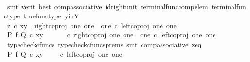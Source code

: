 \begin{isabellebody}
\ \ \ \ \ \ \ \ \isamarkupfalse%
\ {\isacharparenleft}{\kern0pt}smt\ {\isacharparenleft}{\kern0pt}verit{\isacharcomma}{\kern0pt}\ best{\isacharparenright}{\kern0pt}\ comp{\isacharunderscore}{\kern0pt}associative{}\ id{\isacharunderscore}{\kern0pt}right{\isacharunderscore}{\kern0pt}unit{}\ terminal{\isacharunderscore}{\kern0pt}func{\isacharunderscore}{\kern0pt}comp{\isacharunderscore}{\kern0pt}elem\ terminal{\isacharunderscore}{\kern0pt}func{\isacharunderscore}{\kern0pt}type\ true{\isacharunderscore}{\kern0pt}func{\isacharunderscore}{\kern0pt}type\ y{\isacharunderscore}{\kern0pt}in{\isacharunderscore}{\kern0pt}Y{\isacharparenright}{\kern0pt}\isanewline
\ \ \ \ \isamarkupfalse%
\isanewline
\ \ \ \ \ \ \isamarkupfalse%
\ {\isachardoublequoteopen}z\ {\isasymcirc}\isactrlsub c\ {\isasymlangle}x{\isacharcomma}{\kern0pt}y{\isasymrangle}\ {\isacharequal}{\kern0pt}\ right{\isacharunderscore}{\kern0pt}coproj\ one\ {\isacharparenleft}{\kern0pt}one\ {\isasymCoprod}\ one{\isacharparenright}{\kern0pt}\ {\isasymcirc}\isactrlsub c\ left{\isacharunderscore}{\kern0pt}coproj\ one\ one{\isachardoublequoteclose}\isanewline
\ \ \ \ \ \ \isamarkupfalse%
\ \isamarkupfalse%
\ {\isachardoublequoteopen}{\isacharparenleft}{\kern0pt}P\ {\isasymtimes}\isactrlsub f\ Q{\isacharparenright}{\kern0pt}\ {\isasymcirc}\isactrlsub c\ {\isasymlangle}x{\isacharcomma}{\kern0pt}y{\isasymrangle}\ {\isacharequal}{\kern0pt}\ {\isacharparenleft}{\kern0pt}{\isasymlangle}{\isasymt}{\isacharcomma}{\kern0pt}{\isasymt}{\isasymrangle}\ {\isasymamalg}\ {\isasymlangle}{\isasymf}{\isacharcomma}{\kern0pt}{\isasymf}{\isasymrangle}\ {\isasymamalg}\ {\isasymlangle}{\isasymf}{\isacharcomma}{\kern0pt}{\isasymt}{\isasymrangle}{\isacharparenright}{\kern0pt}\ {\isasymcirc}\isactrlsub c\ right{\isacharunderscore}{\kern0pt}coproj\ one\ {\isacharparenleft}{\kern0pt}one\ {\isasymCoprod}\ one{\isacharparenright}{\kern0pt}\ {\isasymcirc}\isactrlsub c\ left{\isacharunderscore}{\kern0pt}coproj\ one\ one{\isachardoublequoteclose}\isanewline
\ \ \ \ \ \ \ \ \isamarkupfalse%
\ {\isacharparenleft}{\kern0pt}typecheck{\isacharunderscore}{\kern0pt}cfuncs{\isacharcomma}{\kern0pt}\ typecheck{\isacharunderscore}{\kern0pt}cfuncs{\isacharunderscore}{\kern0pt}prems{\isacharcomma}{\kern0pt}\ smt\ comp{\isacharunderscore}{\kern0pt}associative{}\ z{\isacharunderscore}{\kern0pt}eq{\isacharparenright}{\kern0pt}\isanewline
\ \ \ \ \ \ \isamarkupfalse%
\ \isamarkupfalse%
\ {\isachardoublequoteopen}{\isacharparenleft}{\kern0pt}P\ {\isasymtimes}\isactrlsub f\ Q{\isacharparenright}{\kern0pt}\ {\isasymcirc}\isactrlsub c\ {\isasymlangle}x{\isacharcomma}{\kern0pt}y{\isasymrangle}\ {\isacharequal}{\kern0pt}\ {\isacharparenleft}{\kern0pt}{\isasymlangle}{\isasymf}{\isacharcomma}{\kern0pt}{\isasymf}{\isasymrangle}\ {\isasymamalg}\ {\isasymlangle}{\isasymf}{\isacharcomma}{\kern0pt}{\isasymt}{\isasymrangle}{\isacharparenright}{\kern0pt}\ {\isasymcirc}\isactrlsub c\ left{\isacharunderscore}{\kern0pt}coproj\ one\ one{\isachardoublequoteclose}\isanewline

\end{isabellebody}
